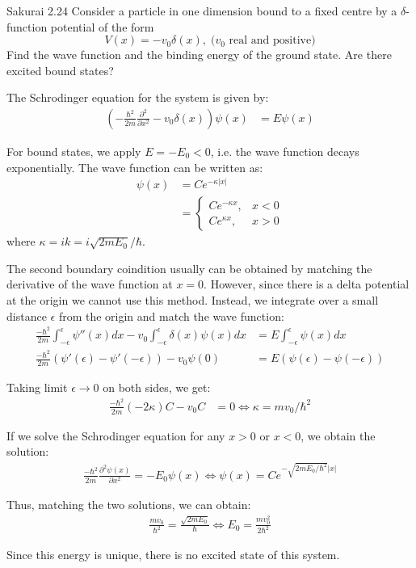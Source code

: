 \documentclass{article}
\begin{document}
\newpage
\begin{section}{Sakurai 2.24}
Consider a particle in one dimension bound to a fixed centre by a $\delta$-function potential of the form
$$
	V(x) = -v_0 \delta(x), \; \text{($v_0$ real and positive)}
$$
Find the wave function and the binding energy of the ground state. Are there excited bound states?

\begin{tcolorbox}[breakable]
	The Schrodinger equation for the system is given by:
	\begin{align*}
		\left( -\frac{\hbar^2}{2m} \frac{\partial^2}{\partial x^2} - v_0 \delta(x) \right) \psi(x) & = E \psi(x)
	\end{align*}

	For bound states, we apply $E = -E_0 < 0$, i.e. the wave function decays exponentially. The wave function can be written as:
	\begin{align*}
		\psi(x) & = C e^{-\kappa |x|}      \\
		        & = \begin{cases}
			            C e^{-\kappa x}, & x<0 \\
			            C e^{\kappa x},  & x>0
		            \end{cases}
	\end{align*}
	where $\kappa = ik = i\sqrt{2mE_0}/\hbar$.

	The second boundary coindition usually can be obtained by matching the derivative of the wave function at $x=0$. However, since there is a delta potential at the origin we cannot use this method. Instead, we integrate over a small distance $\epsilon$ from the origin and match the wave function:
	\begin{align*}
		\frac{-\hbar^2}{2m} \int_{-\epsilon}^{\epsilon} \psi''(x) dx - v_0 \int_{-\epsilon}^{\epsilon} \delta(x) \psi(x) dx
		 & = E \int_{-\epsilon}^{\epsilon} \psi(x) dx \\
		\frac{-\hbar^2}{2m} (\psi'(\epsilon)-\psi'(-\epsilon)) - v_0 \psi(0)
		 & = E (\psi(\epsilon)-\psi(-\epsilon))
	\end{align*}

	Taking limit $\epsilon \to 0$ on both sides, we get:
	\begin{align*}
		\frac{-\hbar^2}{2m} (-2\kappa) C - v_0 C & = 0 \iff \kappa = m v_0/\hbar^2
	\end{align*}

	If we solve the Schrodinger equation for any $x>0$ or $x<0$, we obtain the solution:
	\begin{align*}
		\frac{-\hbar^2}{2m} \frac{\partial^2 \psi(x)}{\partial x^2} = -E_0 \psi(x) \iff \psi(x) = C e^{-\sqrt{2mE_0/\hbar^2} |x|}
	\end{align*}

	Thus, matching the two solutions, we can obtain:
	\begin{align*}
		\frac{m v_0}{\hbar^2} = \frac{\sqrt{2mE_0}}{\hbar} \iff E_0 = \frac{m v_0^2}{2\hbar^2}
	\end{align*}

	Since this energy is unique, there is no excited state of this system.
\end{tcolorbox}
\end{section}
\end{document}
